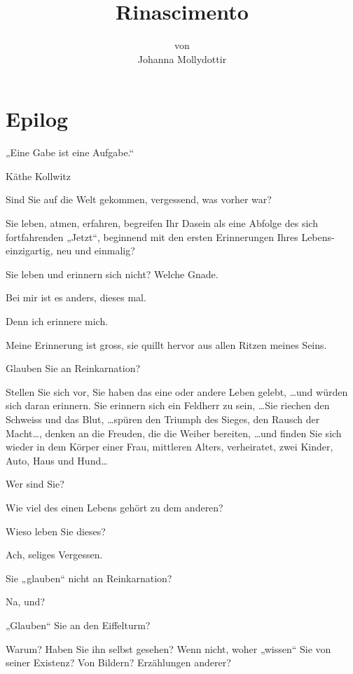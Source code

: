\documentclass[10pt,a5paper]{book}
\author{von\\Johanna Mollydottir}
\title{Rinascimento}
\newenvironment{dichter}{\begin{flushright}}{\end{flushright}}
\begin{document}
 
 \maketitle
\tableofcontents
 
 

\section*{Epilog}



„Eine Gabe ist eine Aufgabe.“
\begin{dichter} Käthe Kollwitz\end{dichter}

Sind Sie auf die Welt gekommen, vergessend, was vorher war?

Sie leben,  atmen, erfahren, begreifen Ihr Dasein als eine Abfolge des sich fortfahrenden „Jetzt“, beginnend mit den ersten Erinnerungen Ihres Lebens- einzigartig, neu und einmalig?

Sie leben und erinnern sich nicht? Welche Gnade.

Bei mir ist es anders, dieses  mal.

Denn ich erinnere mich.

Meine Erinnerung ist gross, sie quillt hervor aus allen Ritzen meines Seins.

Glauben Sie an Reinkarnation?

Stellen Sie sich vor, Sie haben das eine oder andere Leben gelebt, \dots und würden sich daran erinnern. Sie erinnern sich ein Feldherr zu sein, \dots Sie riechen den Schweiss und das Blut, \dots spüren den Triumph des Sieges, den Rausch der Macht\dots, denken an die Freuden, die die Weiber bereiten, \dots und finden Sie sich wieder in dem Körper einer Frau, mittleren Alters, verheiratet, zwei Kinder, Auto, Haus und Hund\dots

Wer sind Sie?

Wie viel des einen Lebens gehört zu dem anderen?

Wieso leben Sie dieses?

Ach, seliges Vergessen.

Sie „glauben“ nicht an Reinkarnation?
 
Na, und?

„Glauben“ Sie an den Eiffelturm?

Warum? Haben Sie ihn selbst gesehen? Wenn nicht, woher „wissen“ Sie von seiner Existenz? Von Bildern? Erzählungen anderer?
\end{document}
